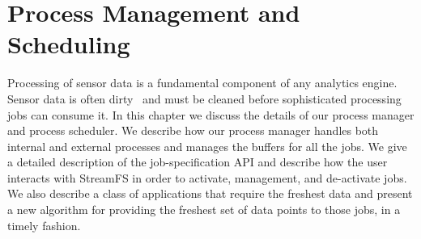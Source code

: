 

\section{Process Management and Scheduling}
\label{chap:ProcMngtSchedMain}

Processing of sensor data is a fundamental component of any analytics engine.  Sensor data is often dirty~\cite{4160603} and
must be cleaned before sophisticated processing jobs can consume it.  
In this chapter we discuss the details of our process manager and process scheduler.  We describe how our process manager handles
both internal and external processes and manages the buffers for all the jobs.  We give a detailed description of the job-specification
API and describe how the user interacts with StreamFS in order to activate, management, and de-activate jobs.  We also 
describe a class of applications that require the freshest data and present a new algorithm for providing the freshest set of data
points to those jobs, in a timely fashion.


% 





% 


